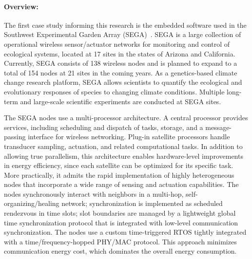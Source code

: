 
\paragraph{Overview:}

The first case study informing this research is the embedded software used in the Southwest Experimental Garden Array (SEGA)~\cite{ClaEtAl11,GhoEtAl2014,BelEtAl2015}.
SEGA is a large collection of operational wireless sensor/actuator networks for monitoring and control of ecological systems, located at 17 sites in the states of Arizona and California.
Currently, SEGA consists of 138 wireless nodes and is planned to expand to a total of 154 nodes at 21 sites in the coming years.
As a genetics-based climate change research platform, SEGA allows scientists to quantify the ecological and evolutionary responses of species to changing climate conditions.
Multiple long-term and large-scale scientific experiments are conducted at SEGA sites.


The SEGA nodes use a multi-processor architecture.
A central processor provides services, including scheduling and dispatch of tasks, storage, and a message-passing interface for wireless networking.
Plug-in satellite processors handle transducer sampling, actuation, and related computational tasks.
In addition to allowing true parallelism, this architecture enables hardware-level improvements in energy efficiency, since each satellite can be optimized for its specific task.
More practically, it admits the rapid implementation of highly heterogeneous nodes that incorporate a wide range of sensing and actuation capabilities.
%
The nodes synchronously interact with neighbors in a multi-hop, self-organizing/healing network; synchronization is implemented as scheduled rendezvous in time slots; slot boundaries are managed by a lightweight global time synchronization protocol that is integrated with low-level communication synchronization.
The nodes use a custom time-triggered RTOS tightly integrated with a time/frequency-hopped PHY/MAC protocol.
This approach %
minimizes communication energy cost, which dominates the overall energy consumption.

